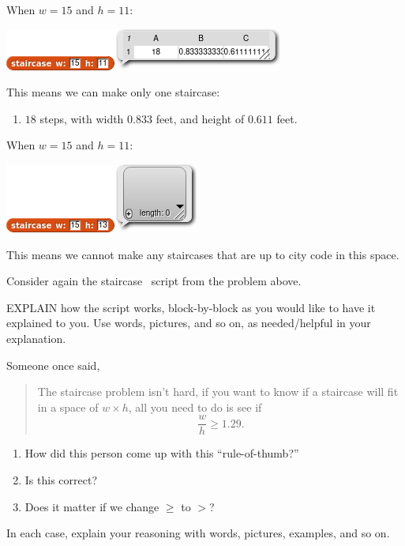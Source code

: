 \documentclass[noauthor,nooutcomes,12pt]{ximera}
\begin{document}
\begin{question}
\begin{freeResponse}
  When $w=15$ and $h=11$:
   \begin{center}
    \includegraphics{answer-15-11-script.png}
   \end{center}
   This means we can make only one staircase:
   \begin{enumerate}
   \item $18$ steps, with width $0.833$ feet, and height of $0.611$ feet.
   \end{enumerate}


   When $w=15$ and $h=11$:
   \begin{center}
    \includegraphics{answer-15-13-script.png}
  \end{center}
   This means we cannot make any staircases that are up to city code in this space.
\end{freeResponse}
\end{question}
\mynewpage

\begin{question}
  Consider again the staircase \snap\ script from the problem above.
  
  EXPLAIN how the script works, block-by-block as you would like to
  have it explained to you. Use words, pictures, and so on, as
  needed/helpful in your explanation.
\end{question}
\mynewpage




\begin{question}
  Someone once said,
  \begin{quote}
    The staircase problem isn't hard, if you want to
 know if a staircase will fit in a space of $w\times h$, all you need
 to do is see if
 \[
 \frac{w}{h} \ge 1.29.
 \]
  \end{quote}
  \begin{enumerate}
    \item How did this person come up with this ``rule-of-thumb?''
    \item Is this correct?
    \item Does it matter if we change $\ge$ to $>$?
  \end{enumerate}
  In each case, explain your reasoning with words, pictures, examples, and so on.
\end{question}
\end{document}

